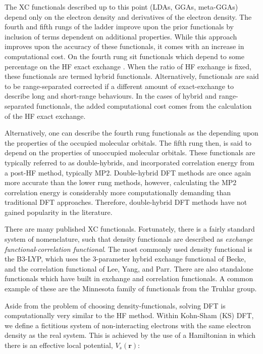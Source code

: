 The XC functionals described up to this point (LDAs, GGAs, meta-GGAs) depend only on the electron density and derivatives of the electron density. The fourth and fifth rungs of the ladder improve upon the prior functionals by inclusion of terms dependent on additional properties. While this approach improves upon the accuracy of these functionals, it comes with an increase in computational cost. On the fourth rung sit functionals which depend to some percentage on the HF exact exchange . When the ratio of HF exchange is fixed, these functionals are termed hybrid functionals. Alternatively, functionals are said to be range-separated corrected if a different amount of exact-exchange to describe long and short-range behaviours. In the cases of hybrid and range-separated functionals, the added computational cost comes from the calculation of the HF exact exchange.

Alternatively, one can describe the fourth rung functionals as the depending upon the properties of the occupied molecular orbitals. The fifth rung then, is said to depend on the properties of unoccupied molecular orbitals. These functionals are typically referred to as double-hybrids, and incorporated correlation energy from a post-HF method, typically MP2.\cite{Goerigk2014} Double-hybrid DFT methods are once again more accurate than the lower rung methods, however, calculating the MP2 correlation energy is considerably more computationally demanding than traditional DFT approaches. Therefore, double-hybrid DFT methods have not gained popularity in the literature.

There are many published XC functionals. Fortunately, there is a fairly standard system of nomenclature, such that density functionals are described as \emph{exchange functional}-\emph{correlation functional}. The most commonly used density functional is the  B3-LYP, which uses the 3-parameter hybrid exchange functional of Becke,\cite{Becke1993} and the correlation functional of Lee, Yang, and Parr.\cite{Lee1988} There are also standalone functionals which have built in exchange and correlation functionals. A common example of these are the Minnesota family of functionals from the Truhlar group.\cite{Zhao2006,Zhao2006a}

Aside from the problem of choosing density-functionals, solving DFT is computationally very similar to the HF method. Within Kohn-Sham (KS) DFT, we define a fictitious system of non-interacting electrons with the same electron density as the real system. This is achieved by the use of a Hamiltonian in which there is an effective local potential, $V_s(\mathbf{r})$:

